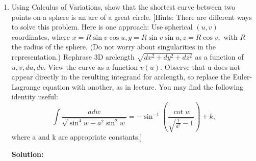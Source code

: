 \documentclass[conference,onecolumn]{IEEEtran}
\begin{document}
\begin{enumerate}
\begin{align*}
                  2\pi y(x) \sqrt{1 + (y'(x))^2} - 2\pi y'(x) \frac{y(x) y'(x)}{\sqrt{1 + (y'(x))^2}} = 2\pi \frac{y(x)}{\sqrt{1 + (y'(x))^2}} & = C \Rightarrow                   \\
                  y'(x)                                                                                                                        & = \pm \sqrt{(Cy)^2 - 1}
            \end{align*}
            Note that the constant $C$ is absorbing all the constants in the equation, so we can solve the equation by separating variables and integrating both sides as
            $$
                  \int \frac{dy}{\sqrt{(Cy)^2 - 1}} = \pm \int dx.
            $$
            Then we get
            $$
                  y(x) = C_1 \cosh\left(\frac{x - C_2}{C_1}\right)
            $$
            Where constants $C_1$ and $C_2$ depends on the boundary conditions $(x_0, y_0)$ and $(x_1, y_1)$.

            The shape visualized with \href{https://www.desmos.com/calculator}{Desmos} looks like a thin vase with big top and bottom, which is reasonable since we want the shape to shrink a little before it reaches another boundary, in order to minimize the surface area.

            \clearpage
      \item Using Calculus of Variations, show that the shortest curve between two points on a sphere is an arc of a great circle.
                  [Hints: There are different ways to solve this problem.
                        Here is one approach: Use spherical $(u, v)$ coordinates, where $x = R \sin v \cos u, y = R \sin v \sin u, z = R \cos v,$ with $R$ the radius of the sphere.
                        (Do not worry about singularities in the representation.)
                        Rephrase 3D arclength $\sqrt{dx^2 + dy^2 + dz^2}$ as a function of $u, v, du, dv$.
                        View the curve as a function $v(u)$.
                        Observe that u does not appear directly in the resulting integrand for arclength, so replace the Euler-Lagrange equation with another, as in lecture.
                        You may find the following identity useful:
                        $$
                              \int \frac{a dw}{\sqrt{\sin^4 w - a^2 \sin^2 w}} = - \sin^{-1}(\frac{\cot w}{\sqrt{\frac{1}{a^2} - 1}}) + k,
                        $$
                        where a and k are appropriate constants.]

            \textbf{Solution:}


\end{enumerate}
\end{document}
